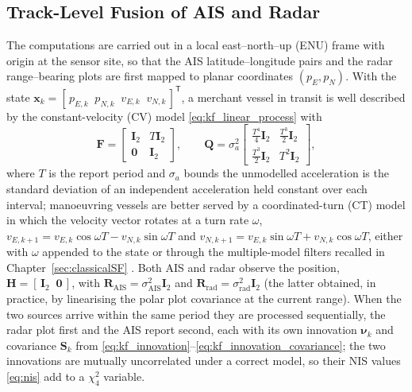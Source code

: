 \documentclass[graybox,envcountchap]{style/SNmono}
\providecommand{\DIFadd}[1]{{\protect\color{blue} #1}} %
\providecommand{\DIFdel}[1]{{\protect\color{red} #1}} %
\providecommand{\DIFaddbegin}{} %
\providecommand{\DIFaddend}{} %
\providecommand{\DIFdelbegin}{} %
\providecommand{\DIFdelend}{} %
\begin{document}
\subsection{Track-Level Fusion of AIS and Radar}
\label{subsec:ais-radar-track-fusion}
The computations are carried out in a local east--north--up (ENU) frame with origin at the sensor site, so that the AIS latitude--longitude pairs and the radar range--bearing plots are first mapped to planar coordinates $(p_E,p_N)$. With the state $\mathbf{x}_k=[\,p_{E,k}\;\;p_{N,k}\;\;v_{E,k}\;\;v_{N,k}\,]^{\mathsf T}$, a merchant vessel in transit is well described by the constant-velocity (CV) model \eqref{eq:kf_linear_process} with
\begin{equation}
\mathbf{F}=
\begin{bmatrix}
\mathbf{I}_2 & T\mathbf{I}_2\\ \mathbf{0} & \mathbf{I}_2
\end{bmatrix},
\qquad
\mathbf{Q}=\sigma_a^{2}
\begin{bmatrix}
\tfrac{T^{4}}{4}\mathbf{I}_2 & \tfrac{T^{3}}{2}\mathbf{I}_2\\[2pt]
\tfrac{T^{3}}{2}\mathbf{I}_2 & T^{2}\mathbf{I}_2
\end{bmatrix},
\label{eq:ch07-cv-model}
\end{equation}
where $T$ is the report period and $\sigma_a$ \DIFdelbegin \DIFdel{bounds the unmodelled acceleration }\DIFdelend \DIFaddbegin \DIFadd{is the standard deviation of an independent acceleration held constant over each interval}\DIFaddend ; manoeuvring vessels are better served by a coordinated-turn (CT) model in which the velocity vector rotates at a turn rate $\omega$, $v_{E,k+1}=v_{E,k}\cos\omega T-v_{N,k}\sin\omega T$ and $v_{N,k+1}=v_{E,k}\sin\omega T+v_{N,k}\cos\omega T$, either with $\omega$ appended to the state or through the multiple-model filters recalled in Chapter~\ref{sec:classicalSF} \cite{barshalom2001_estimation}. Both AIS and radar observe the position, $\mathbf{H}=[\,\mathbf{I}_2\;\;\mathbf{0}\,]$, with $\mathbf{R}_{\mathrm{AIS}}=\sigma_{\mathrm{AIS}}^{2}\mathbf{I}_2$ and $\mathbf{R}_{\mathrm{rad}}=\sigma_{\mathrm{rad}}^{2}\mathbf{I}_2$ (the latter obtained, in practice, by linearising the polar plot covariance at the current range). When the two sources arrive within the same period they are processed sequentially, the radar plot first and the AIS report second, each with its own innovation $\boldsymbol{\nu}_k$ and covariance $\mathbf{S}_k$ from \eqref{eq:kf_innovation}--\eqref{eq:kf_innovation_covariance}; the two innovations are mutually uncorrelated under a correct model, so their NIS values \eqref{eq:nis} add to a $\chi^{2}_{4}$ variable.
\end{document}

